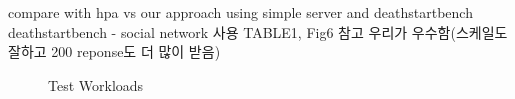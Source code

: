 \documentclass[conference]{IEEEtran}
\begin{document}
compare with hpa vs our approach using simple server and deathstartbench
deathstartbench - social network 사용
TABLE1, Fig6 참고 우리가 우수함(스케일도 잘하고 200 reponse도 더 많이 받음)








\begin{figure}[ht!]
    \centering
    \caption{Test Workloads}
    \label{fig:test_workloads}
\end{figure}
\end{document}
